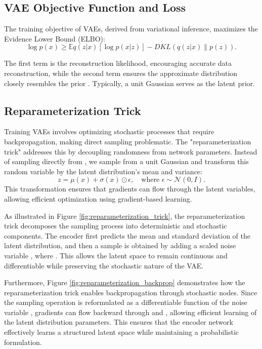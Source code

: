 \subsection{VAE Objective Function and Loss} \label{subsec:VAE Objective Function and Loss}
The training objective of VAEs, derived from variational inference, maximizes the Evidence Lower Bound (ELBO):
\begin{equation}
\log p(x) \geq \mathbb{E}{q(z|x)}[\log p(x|z)] - D{KL}(q(z|x) \parallel p(z)).
\end{equation}

The first term is the reconstruction likelihood, encouraging accurate data reconstruction, while the second term ensures the approximate distribution  closely resembles the prior . Typically, a unit Gaussian  serves as the latent prior.

\subsection{Reparameterization Trick} \label{subsec:reparameterization_trick}
Training VAEs involves optimizing stochastic processes that require backpropagation, making direct sampling problematic. The "reparameterization trick" addresses this by decoupling randomness from network parameters. Instead of sampling directly from , we sample from a unit Gaussian and transform this random variable by the latent distribution's mean and variance:
\begin{equation}
z = \mu(x) + \sigma(x) \odot \epsilon, \quad \text{where } \epsilon \sim \mathcal{N}(0, I).
\end{equation}
This transformation ensures that gradients can flow through the latent variables, allowing efficient optimization using gradient-based learning.

As illustrated in Figure \ref{fig:reparameterization_trick}, the reparameterization trick decomposes the sampling process into deterministic and stochastic components. The encoder first predicts the mean  and standard deviation  of the latent distribution, and then a sample  is obtained by adding a scaled noise variable , where . This allows the latent space to remain continuous and differentiable while preserving the stochastic nature of the VAE.

Furthermore, Figure \ref{fig:reparameterization_backprop} demonstrates how the reparameterization trick enables backpropagation through stochastic nodes. Since the sampling operation is reformulated as a differentiable function of the noise variable , gradients can flow backward through  and , allowing efficient learning of the latent distribution parameters. This ensures that the encoder network effectively learns a structured latent space while maintaining a probabilistic formulation.

